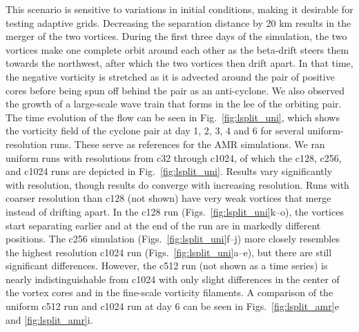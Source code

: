 This scenario is sensitive to variations in
initial conditions, making it desirable for testing adaptive grids.
Decreasing the separation distance by 20 km results in the merger of the
two vortices.  During the first three days of the simulation, the two vortices 
make one complete orbit around each other as the beta-drift steers them
towards the northwest, after which the two vortices then drift apart.
In that time, the negative vorticity is stretched as it is advected
around the pair of positive cores before being spun off behind the pair
as an anti-cyclone.  We also observed the growth of a large-scale wave
train that forms in the lee of the orbiting pair.  The time evolution of
the flow can be seen in 
Fig.~\ref{fig:lsplit_uni}, which shows the vorticity field of the cyclone
pair at day 1, 2, 3, 4 and 6 for several uniform-resolution runs.  These serve as
references for the AMR simulations.  We ran uniform runs with
resolutions from c32 through c1024, of which the c128, c256, and c1024
runs are depicted in 
Fig.~\ref{fig:lsplit_uni}.  Results vary significantly with resolution,
though results do converge with increasing resolution.  Runs with
coarser resolution than c128 (not shown) have very weak vortices that
merge instead of drifting apart.  In the c128 run
(Figs.~\ref{fig:lsplit_uni}k--o), the vortices start separating earlier and at
the end of the run are in markedly different positions.  The c256
simulation
(Figs.~\ref{fig:lsplit_uni}f--j) more closely resembles the highest resolution
c1024 run
(Figs.~\ref{fig:lsplit_uni}a--e), but there are still significant differences.
However, the c512 run (not shown as a time series) is nearly indistinguishable from c1024 with only
slight differences in the center of the vortex cores and in the
fine-scale vorticity filaments.  A comparison of the uniform c512 run
and c1024 run at day 6 can be seen in 
Figs.~\ref{fig:lsplit_amr}e and \ref{fig:lsplit_amr}i.
%
